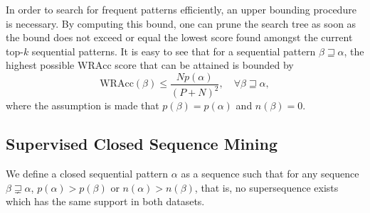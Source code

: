 \documentclass{sigkddExp}
\newcommand{\wracc}{\mathrm{WRAcc}}
\begin{document}
In order to search for frequent patterns efficiently, an upper bounding procedure is necessary.
By computing this bound, one can prune the search tree as soon as the bound does not exceed or equal the lowest score found amongst the current top-\(k\) sequential patterns.
It is easy to see that for a sequential pattern \(\beta \sqsupseteq \alpha\), the highest possible \(\wracc\) score that can be attained is bounded by
\begin{equation}
\wracc(\beta) \leqslant \frac{N p(\alpha)}{(P + N)^2}, \quad \forall \beta \sqsupseteq \alpha,
\end{equation}
where the assumption is made that \(p(\beta) = p(\alpha)\) and \(n(\beta) = 0\).

\subsection{Supervised Closed Sequence Mining}
\label{sec:scsm}
We define a closed sequential pattern \(\alpha\) as a sequence such that for any sequence \(\beta \sqsupsetneq \alpha\), \(p(\alpha) > p(\beta)\) or \(n(\alpha) > n(\beta)\), that is, no supersequence exists which has the same support in both datasets.
\end{document}
